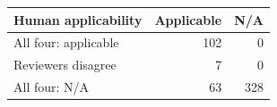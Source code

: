 \begin{tabular}{lrr}
\toprule
Human applicability & Applicable & N/A \\
\midrule
All four: applicable & 102 & 0 \\
Reviewers disagree & 7 & 0 \\
All four: N/A & 63 & 328 \\
\bottomrule
\end{tabular}
